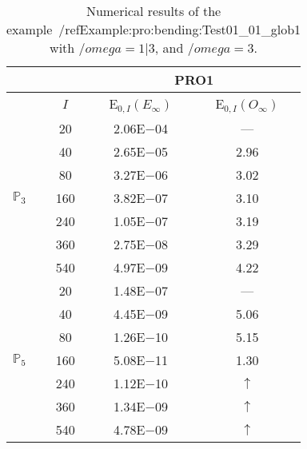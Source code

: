 \begin{table}[H]
\caption{Numerical results of the example~/ref{Example:pro:bending:Test01_01_glob1} with $/omega=1|3$, and $/omega=3$.}
\setlength{\tabcolsep}{5pt}
\centering
\begin{tabular}{@{}l c c c@{}}
\toprule
 &  & \multicolumn{2}{c}{PRO1}\\
\midrule
 & $I$ & E$_{0,I}(E_{\infty})$ & E$_{0,I}(O_{\infty})$\\
\midrule
\multirow{7}{*}{$\mathbb{P}_{3}$}
 & 20 & 2.06E$-$04 & ---\\
 & 40 & 2.65E$-$05 & 2.96\\
 & 80 & 3.27E$-$06 & 3.02\\
 & 160 & 3.82E$-$07 & 3.10\\
 & 240 & 1.05E$-$07 & 3.19\\
 & 360 & 2.75E$-$08 & 3.29\\
 & 540 & 4.97E$-$09 & 4.22\\
\midrule
\multirow{7}{*}{$\mathbb{P}_{5}$}
 & 20 & 1.48E$-$07 & ---\\
 & 40 & 4.45E$-$09 & 5.06\\
 & 80 & 1.26E$-$10 & 5.15\\
 & 160 & 5.08E$-$11 & 1.30\\
 & 240 & 1.12E$-$10 & $\uparrow$\\
 & 360 & 1.34E$-$09 & $\uparrow$\\
 & 540 & 4.78E$-$09 & $\uparrow$\\
\bottomrule
\end{tabular}
\label{Table:pRO:test_01_01_test3_pro2}
\end{table}

